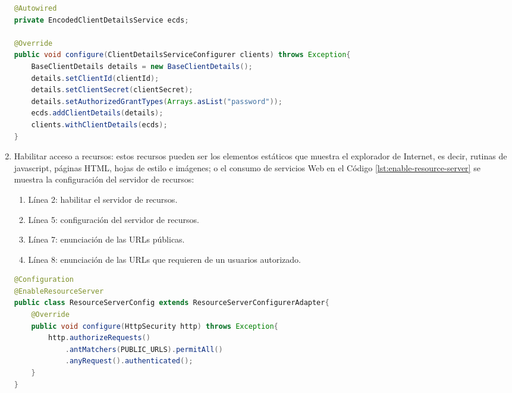 \begin{enumerate}
\begin{lstlisting}[language=Java, caption={Clase de autenticación de cliente.}, captionpos=b, label={lst:client-auth}]
@Autowired
private EncodedClientDetailsService ecds;

@Override
public void configure(ClientDetailsServiceConfigurer clients) throws Exception{
	BaseClientDetails details = new BaseClientDetails();
	details.setClientId(clientId);
	details.setClientSecret(clientSecret);
	details.setAuthorizedGrantTypes(Arrays.asList("password"));
	ecds.addClientDetails(details);
	clients.withClientDetails(ecds);
}
\end{lstlisting}


	\item Habilitar acceso a recursos: estos recursos pueden ser los elementos estáticos que muestra el explorador de Internet, es decir, rutinas de javascript, páginas HTML, hojas de estilo e imágenes; o el consumo de servicios Web en el Código \ref{lst:enable-resource-server} se muestra la configuración del servidor de recursos:

	\begin{enumerate}
		\item Línea 2: habilitar el servidor de recursos.
		\item Línea 5: configuración del servidor de recursos.
		\item Línea 7: enunciación de las URLs públicas.
		\item Línea 8: enunciación de las URLs que requieren de un usuarios autorizado. 
	\end{enumerate}

\begin{lstlisting}[language=Java, caption={Clase de configuración de servidor de recursos.}, captionpos=b, label={lst:enable-resource-server}]
@Configuration
@EnableResourceServer
public class ResourceServerConfig extends ResourceServerConfigurerAdapter{
	@Override
	public void configure(HttpSecurity http) throws Exception{
		http.authorizeRequests()
			.antMatchers(PUBLIC_URLS).permitAll()
			.anyRequest().authenticated();
	}
}
\end{lstlisting}
\end{enumerate}

